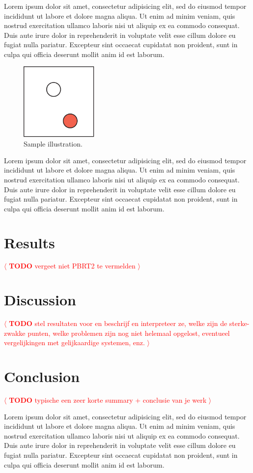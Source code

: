 \documentclass[review]{acmsiggraph}
\newcommand{\todo}[1]{\textcolor{red}{\(\langle\) \textbf{TODO} #1 \(\rangle\) }}
\begin{document}
Lorem ipsum dolor sit amet, consectetur adipisicing elit, sed do
eiusmod tempor incididunt ut labore et dolore magna aliqua. Ut enim ad
minim veniam, quis nostrud exercitation ullamco laboris nisi ut
aliquip ex ea commodo consequat. Duis aute irure dolor in
reprehenderit in voluptate velit esse cillum dolore eu fugiat nulla
pariatur. Excepteur sint occaecat cupidatat non proident, sunt in
culpa qui officia deserunt mollit anim id est laborum.
\begin{figure}[ht]
  \centering
  \includegraphics[width=1.5in]{images/samplefigure}
  \caption{Sample illustration.}
\end{figure}
Lorem ipsum dolor sit amet, consectetur adipisicing elit, sed do
eiusmod tempor incididunt ut labore et dolore magna aliqua. Ut enim ad
minim veniam, quis nostrud exercitation ullamco laboris nisi ut
aliquip ex ea commodo consequat. Duis aute irure dolor in
reprehenderit in voluptate velit esse cillum dolore eu fugiat nulla
pariatur. Excepteur sint occaecat cupidatat non proident, sunt in
culpa qui officia deserunt mollit anim id est laborum.

\section{Results}
\todo{vergeet niet PBRT2 te vermelden}
\section{Discussion}
\todo{stel resultaten voor en beschrijf en interpreteer ze, welke zijn de sterke-zwakke punten, welke problemen zijn nog niet helemaal opgelost, eventueel vergelijkingen met gelijkaardige systemen, enz.}
\\

\section{Conclusion}
\todo{typische een zeer korte summary + conclusie van je werk}

Lorem ipsum dolor sit amet, consectetur adipisicing elit, sed do
eiusmod tempor incididunt ut labore et dolore magna aliqua. Ut enim ad
minim veniam, quis nostrud exercitation ullamco laboris nisi ut
aliquip ex ea commodo consequat. Duis aute irure dolor in
reprehenderit in voluptate velit esse cillum dolore eu fugiat nulla
pariatur. Excepteur sint occaecat cupidatat non proident, sunt in
culpa qui officia deserunt mollit anim id est laborum.
\end{document}
